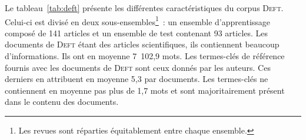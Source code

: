     Le tableau~\ref{tab:deft} présente les différentes caractéristiques du
    corpus \textsc{Deft}. Celui-ci est divisé en deux
    sous-ensembles\footnote{Les revues sont réparties équitablement entre chaque
    ensemble.}~: un ensemble d'apprentissage composé de 141 articles et un
    ensemble de test contenant 93 articles. Les documents de \textsc{Deft} étant
    des articles scientifiques, ils contiennent beaucoup d'informations. Ils ont
    en moyenne 7~102,9 mots. Les termes-clés de référence fournis avec les
    documents de \textsc{Deft} sont ceux donnés par les auteurs. Ces derniers en
    attribuent en moyenne 5,3 par documents. Les termes-clés ne contiennent en
    moyenne pas plus de 1,7 mots et sont majoritairement présent dans le contenu
    des documents.
    \begin{table}[!h]
      \centering
      \caption{Corpus \textsc{Deft}
               \label{tab:deft}}
    \end{table}

